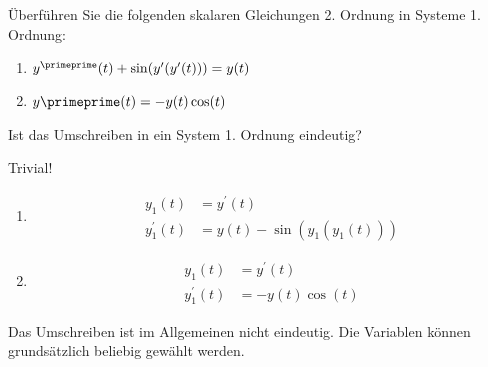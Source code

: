 \begin{exercise}

Überführen Sie die folgenden skalaren Gleichungen 2. Ordnung in Systeme 1. Ordnung:

\begin{enumerate}[label = \textbf{\alph*)}]

  \item $y^\primeprime(t) + \sin(y^\prime(y^\prime(t))) = y(t)$

  \item $y\primeprime(t) = -y(t) \cos(t)$

\end{enumerate}

Ist das Umschreiben in ein System 1. Ordnung eindeutig?

\end{exercise}

\begin{solution}

Trivial!

\begin{enumerate}[label = \textbf{\alph*)}]

  \item
  \begin{align*}
    y_1(t) & = y^\prime(t) \\
    y_1^\prime(t) & = y(t) - \sin(y_1(y_1(t)))
  \end{align*}

  \item
  \begin{align*}
    y_1(t) & = y^\prime(t) \\
    y_1^\prime(t) & = -y(t)\cos(t)
  \end{align*}

\end{enumerate}

Das Umschreiben ist im Allgemeinen nicht eindeutig.
Die Variablen können grundsätzlich beliebig gewählt werden.

\end{solution}

